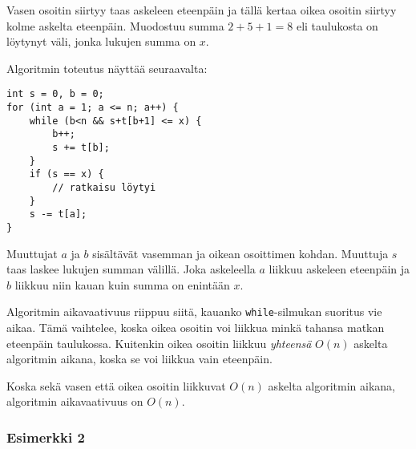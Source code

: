 Vasen osoitin siirtyy taas askeleen eteenpäin
ja tällä kertaa oikea osoitin siirtyy kolme askelta
eteenpäin. Muodostuu summa $2+5+1=8$ eli taulukosta
on löytynyt väli, jonka lukujen summa on $x$.

\begin{center}
\end{center}

Algoritmin toteutus näyttää seuraavalta:

\begin{lstlisting}
int s = 0, b = 0;
for (int a = 1; a <= n; a++) {
    while (b<n && s+t[b+1] <= x) {
        b++;
        s += t[b];
    }
    if (s == x) {
        // ratkaisu löytyi
    }
    s -= t[a];
}
\end{lstlisting}

Muuttujat $a$ ja $b$ sisältävät vasemman ja oikean
osoittimen kohdan.
Muuttuja $s$ taas laskee lukujen summan välillä.
Joka askeleella $a$ liikkuu askeleen eteenpäin
ja $b$ liikkuu niin kauan kuin summa on enintään $x$.

Algoritmin aikavaativuus riippuu siitä,
kauanko \texttt{while}-silmukan suoritus vie aikaa.
Tämä vaihtelee, koska oikea osoitin voi liikkua
minkä tahansa matkan eteenpäin taulukossa.
Kuitenkin oikea osoitin liikkuu \textit{yhteensä}
$O(n)$ askelta algoritmin aikana, koska se voi
liikkua vain eteenpäin.

Koska sekä vasen että oikea osoitin liikkuvat
$O(n)$ askelta algoritmin aikana,
algoritmin aikavaativuus on $O(n)$.

\subsubsection{Esimerkki 2}

